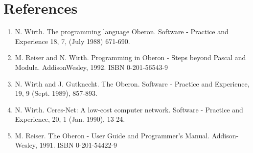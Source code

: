 \section*{References}
\begin{enumerate}
  \item N. Wirth. The programming language Oberon. Software - Practice and Experience 18, 7, (July 1988) 671-690.
  \item M. Reiser and N. Wirth. Programming in Oberon - Steps beyond Pascal and Modula. AddisonWesley, 1992. ISBN 0-201-56543-9
  \item N. Wirth and J. Gutknecht. The Oberon. Software - Practice and Experience, 19, 9 (Sept. 1989), 857-893.
  \item N. Wirth. Ceres-Net: A low-cost computer network. Software - Practice and Experience, 20, 1 (Jan. 1990), 13-24.
  \item M. Reiser. The Oberon - User Guide and Programmer's Manual. Addison-Wesley, 1991. ISBN 0-201-54422-9
\end{enumerate}
